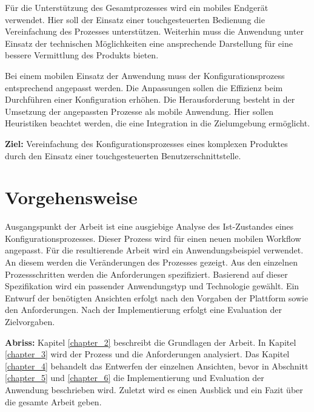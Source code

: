 Für die Unterstützung des Gesamtprozesses wird ein mobiles Endgerät verwendet. Hier soll der Einsatz einer touchgesteuerten Bedienung die Vereinfachung des Prozesses unterstützen. Weiterhin muss die Anwendung unter Einsatz der technischen Möglichkeiten eine ansprechende Darstellung für eine bessere Vermittlung des Produkts bieten. 

Bei einem mobilen Einsatz der Anwendung muss der Konfigurationsprozess entsprechend angepasst werden. Die Anpassungen sollen die Effizienz beim Durchführen einer Konfiguration erhöhen. Die Herausforderung besteht in der Umsetzung der angepassten Prozesse als mobile Anwendung. Hier sollen Heuristiken beachtet werden, die eine Integration in die Zielumgebung ermöglicht. 



\begin{mdframed}[backgroundcolor=gray!40,shadow=true,roundcorner=8pt]
\textbf{Ziel:} \newline
Vereinfachung des Konfigurationsprozesses eines komplexen Produktes durch den Einsatz einer touchgesteuerten Benutzerschnittstelle.
\end{mdframed}

\section{Vorgehensweise}
Ausgangspunkt der Arbeit ist eine ausgiebige Analyse des Ist-Zustandes eines Konfigurationsprozesses. Dieser Prozess wird für einen neuen mobilen Workflow angepasst. Für die resultierende Arbeit wird ein Anwendungsbeispiel verwendet. An diesem werden die Veränderungen des Prozesses gezeigt. Aus den einzelnen Prozessschritten werden die Anforderungen spezifiziert. Basierend auf dieser Spezifikation wird ein passender Anwendungstyp und Technologie gewählt. Ein Entwurf der benötigten Ansichten erfolgt nach den Vorgaben der Plattform sowie den Anforderungen. Nach der Implementierung erfolgt eine Evaluation der Zielvorgaben. 
\par
\textbf{Abriss: }
Kapitel \ref{chapter_2} beschreibt die Grundlagen der Arbeit. In Kapitel \ref{chapter_3} wird der Prozess und die Anforderungen analysiert. Das Kapitel \ref{chapter_4} behandelt das Entwerfen der einzelnen Ansichten, bevor in Abschnitt \ref{chapter_5} und \ref{chapter_6} die Implementierung und Evaluation der Anwendung beschrieben wird. Zuletzt wird es einen Ausblick und ein Fazit über die gesamte Arbeit geben.







